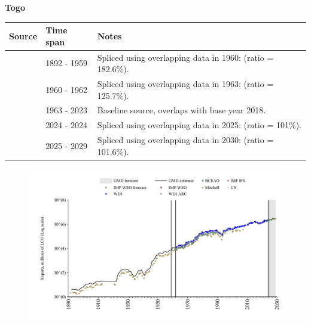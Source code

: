 \documentclass[12pt,a4paper,landscape]{article}
\begin{document}
\begin{adjustbox}{max totalsize={\paperwidth}{\paperheight},center}
\begin{minipage}[t][\textheight][t]{\textwidth}
\vspace*{0.5cm}
{}
\begin{center}
{\Large\bfseries Togo}
\end{center}
\vspace{0.5cm}
\begin{table}[H]
\centering
\small
\begin{tabular}{|l|l|l|}
\hline
\textbf{Source} & \textbf{Time span} & \textbf{Notes} \\
\hline
\rowcolor{white}\cite{Mitchell}& 1892 - 1959 &Spliced using overlapping data in 1960: (ratio = 182.6\%).\\
\rowcolor{lightgray}\cite{WDI_ARC}& 1960 - 1962 &Spliced using overlapping data in 1963: (ratio = 125.7\%).\\
\rowcolor{white}\cite{WDI}& 1963 - 2023 &Baseline source, overlaps with base year 2018.\\
\rowcolor{lightgray}\cite{BCEAO}& 2024 - 2024 &Spliced using overlapping data in 2025: (ratio = 101\%).\\
\rowcolor{white}\cite{IMF_WEO_forecast}& 2025 - 2029 &Spliced using overlapping data in 2030: (ratio = 101.6\%).\\
\hline
\end{tabular}
\end{table}
\begin{figure}[H]
\centering
\includegraphics[width=\textwidth,height=0.6\textheight,keepaspectratio]{graphs/TGO_imports.pdf}
\end{figure}
\end{minipage}
\end{adjustbox}
\end{document}
